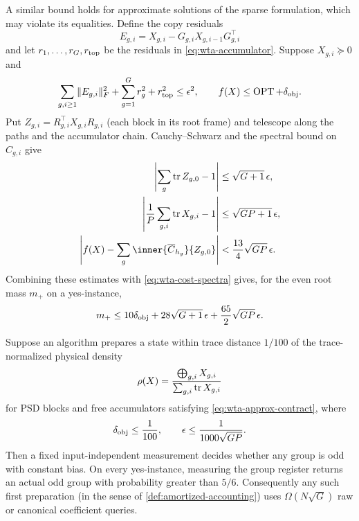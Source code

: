 A similar bound holds for approximate solutions of the sparse formulation,
which may violate its equalities.  Define the copy residuals
\begin{equation}
 E_{g,i}=X_{g,i}-G_{g,i}X_{g,i-1}G_{g,i}^\top
 \label{eq:wta-copy-residual}
\end{equation}
and let $r_1,\ldots,r_G,r_{\rm top}$ be the residuals in
\eqref{eq:wta-accumulator}.  Suppose $X_{g,i}\succeq0$ and
\begin{equation}
 \sum_{g,i\ge1}\lVert E_{g,i}\rVert_F^2+
 \sum_{g=1}^G r_g^2+r_{\rm top}^2\le\epsilon^2,
 \qquad f(X)\le\operatorname{OPT}+\delta_{\rm obj}.
 \label{eq:wta-approx-contract}
\end{equation}
Put $Z_{g,i}=R_{g,i}^\top X_{g,i}R_{g,i}$ (each block in its root frame) and
telescope along the paths and the accumulator chain.
Cauchy--Schwarz and the spectral bound on $C_{g,i}$ give
\begin{align}
 \left|\sum_g\tr Z_{g,0}-1\right|&\le\sqrt{G+1}\,\epsilon,
 \label{eq:wta-root-trace-error}\\
 \left|\frac1P\sum_{g,i}\tr X_{g,i}-1\right|&\le\sqrt{GP+1}\,\epsilon,
 \label{eq:wta-physical-trace-error}\\
 \left|f(X)-\sum_g\inner{\overline C_{h_g}}{Z_{g,0}}\right|
 &<\frac{13}{4}\sqrt{GP}\,\epsilon.
 \label{eq:wta-objective-lift-error}
\end{align}
Combining these estimates with \eqref{eq:wta-cost-spectra} gives, for the
even root mass $m_+$ on a yes-instance,
\begin{equation}
 m_+\le10\delta_{\rm obj}+28\sqrt{G+1}\,\epsilon
              +\frac{65}{2}\sqrt{GP}\,\epsilon.
 \label{eq:wta-robust-even-mass}
\end{equation}

\begin{theorem}
\label{thm:wta-robust-optimizer}
Suppose an algorithm prepares a state within trace distance $1/100$ of the
trace-normalized physical density
\begin{equation}
 \rho(X)=\frac{\bigoplus_{g,i}X_{g,i}}
                 {\sum_{g,i}\operatorname{tr} X_{g,i}}
 \label{eq:wta-optimizer-density}
\end{equation}
for PSD blocks and free accumulators satisfying
\eqref{eq:wta-approx-contract}, where
\begin{equation}
 \delta_{\rm obj}\le\frac1{100},
 \qquad \epsilon\le\frac1{1000\sqrt{GP}}.
 \label{eq:wta-optimizer-tolerances}
\end{equation}
Then a fixed input-independent measurement decides whether any
group is odd with constant bias.  On every yes-instance, measuring the group register returns
an actual odd group with probability greater than $5/6$.  Consequently any
such first preparation (in the sense of \cref{def:amortized-accounting})
uses $\Omega(N\sqrt G)$ raw or canonical coefficient
queries.
\end{theorem}

